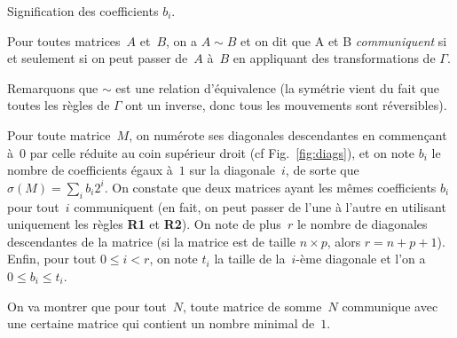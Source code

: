 \begin{floatingfigure}[r]{.5\textwidth}
\centering
\vspace{-.5em}
\caption{Signification des coefficients $b_i$.}
\label{fig:diags}
\end{floatingfigure}

\begin{df*}
Pour toutes matrices~$A$ et~$B$, on a $A\sim B$ et on dit que A et B \emph{communiquent} si et seulement si on peut passer de~$A$ à~$B$ en appliquant des transformations de $\Gamma$.
\end{df*}

Remarquons que $\sim$ est une relation d'équivalence (la symétrie vient du fait que toutes les règles de $\Gamma$ ont un inverse, donc tous les mouvements sont réversibles).

Pour toute  matrice~$M$, on numérote  ses diagonales descendantes  en commençant
à~$0$ par celle réduite au coin supérieur droit (cf Fig.~\ref{fig:diags}), et on
note $b_i$ le nombre de coefficients  égaux à~$1$ sur la diagonale~$i$, de sorte
que  \mbox{$\sigma (M) =  \sum\limits_ib_i2^i$}. On  constate que  deux matrices
ayant les mêmes  coefficients $b_i$ pour tout~$i$ communiquent
(en fait, on  peut passer de l'une à l'autre en  utilisant uniquement les règles
\textbf{R1}  et \textbf{R2}).   On  note  de plus~$r$  le  nombre de  diagonales
descendantes de la matrice (si la matrice  est de taille $n\times p$, alors $r =
n+p+1$).  Enfin, pour tout $0\leq i <  r$, on note $t_i$ la taille de la~$i$-ème
diagonale et l'on a $0\leq b_i \leq t_i$.
 
On va montrer que pour tout~$N$, toute matrice de somme~$N$ communique avec une certaine matrice qui contient un nombre minimal de~$1$.

